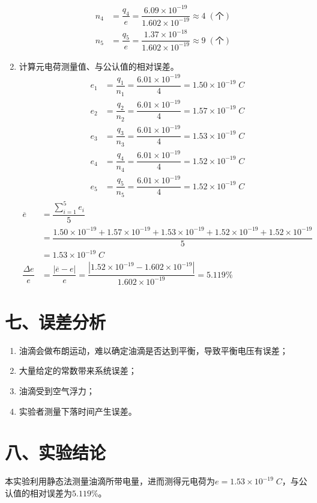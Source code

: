 \documentclass[11pt]{article}
\begin{document}
\begin{enumerate}
\begin{align*}
        n_4&=\dfrac{q_4}{e}=\dfrac{6.09\times10^{-19}}{1.602\times10^{-19}}\approx4\;(\text{个}) \\
        n_5&=\dfrac{q_5}{e}=\dfrac{1.37\times10^{-18}}{1.602\times10^{-19}}\approx9\;(\text{个}) 
    \end{align*}
    \item 计算元电荷测量值、与公认值的相对误差。
    \begin{align*}
        \quad e_1&=\dfrac{q_1}{n_1}=\dfrac{6.01\times10^{-19}}{4}=1.50\times10^{-19}\;C \\
        \quad e_2&=\dfrac{q_2}{n_2}=\dfrac{6.01\times10^{-19}}{4}=1.57\times10^{-19}\;C \\
        \quad e_3&=\dfrac{q_3}{n_3}=\dfrac{6.01\times10^{-19}}{4}=1.53\times10^{-19}\;C \\
        \quad e_4&=\dfrac{q_4}{n_4}=\dfrac{6.01\times10^{-19}}{4}=1.52\times10^{-19}\;C \\
        \quad e_5&=\dfrac{q_5}{n_5}=\dfrac{6.01\times10^{-19}}{4}=1.52\times10^{-19}\;C
    \end{align*}
    \begin{align*}
        \overline{e}&=\dfrac{\sum_{i=1}^{5}e_i}{5} \\
        &=\dfrac{1.50\times10^{-19}+1.57\times10^{-19}+1.53\times10^{-19}+1.52\times10^{-19}+1.52\times10^{-19}}{5} \\
        &=1.53\times10^{-19}\;C \\
        \dfrac{\Delta e}{e}&=\dfrac{|\overline{e}-e|}{e}=\dfrac{|1.52\times10^{-19}-1.602\times10^{-19}|}{1.602\times10^{-19}}=5.119\%
    \end{align*}
\end{enumerate}

\section*{七、误差分析}

\begin{enumerate}
    \item 油滴会做布朗运动，难以确定油滴是否达到平衡，导致平衡电压有误差；
    \item 大量给定的常数带来系统误差；
    \item 油滴受到空气浮力；
    \item 实验者测量下落时间产生误差。
\end{enumerate}

\section*{八、实验结论}

本实验利用静态法测量油滴所带电量，进而测得元电荷为$e=1.53\times10^{-19}\;C$，与公认值的相对误差为$5.119\%$。
\end{document}
